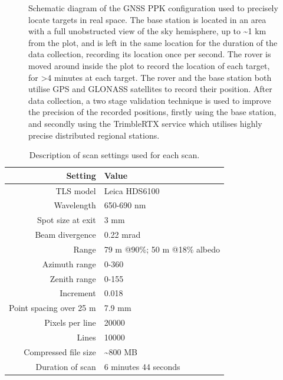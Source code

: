 \begin{refsection}
\begin{figure}
	\caption[Schematic diagram of GNSS PPK configuration]{Schematic diagram of the GNSS PPK configuration used to precisely locate targets in real space. The base station is located in an area with a full unobstructed view of the sky hemisphere, up to \textasciitilde{}1 km from the plot, and is left in the same location for the duration of the data collection, recording its location once per second. The rover is moved around inside the plot to record the location of each target, for >4 minutes at each target. The rover and the base station both utilise GPS and GLONASS satellites to record their position. After data collection, a two stage validation technique is used to improve the precision of the recorded positions, firstly using the base station, and secondly using the TrimbleRTX service which utilises highly precise distributed regional stations.}
	\label{workflow:ppk}
\end{figure}

\begin{table} 
	\centering 
  \caption{Description of scan settings used for each scan.} 
  \label{workflow:scan_settings} 
\begin{tabular}{rl} 
	\toprule
{Setting} & {Value} \\
	\midrule
TLS model & Leica HDS6100 \\
Wavelength & 650-690 nm \\
Spot size at exit & 3 mm \\
Beam divergence & 0.22 mrad \\
Range & 79 m @90\%; 50 m @18\% albedo \\
Azimuth range & 0-360\textdegree{} \\
Zenith range & 0-155\textdegree{} \\
Increment & 0.018\textdegree{} \\
Point spacing over 25 m & 7.9 mm \\
Pixels per line & \num{20000} \\
Lines & \num{10000} \\
Compressed file size & \textasciitilde{}800 MB \\
Duration of scan & 6 minutes 44 seconds \\
	\bottomrule
\end{tabular} 
\end{table} 



\end{refsection}
